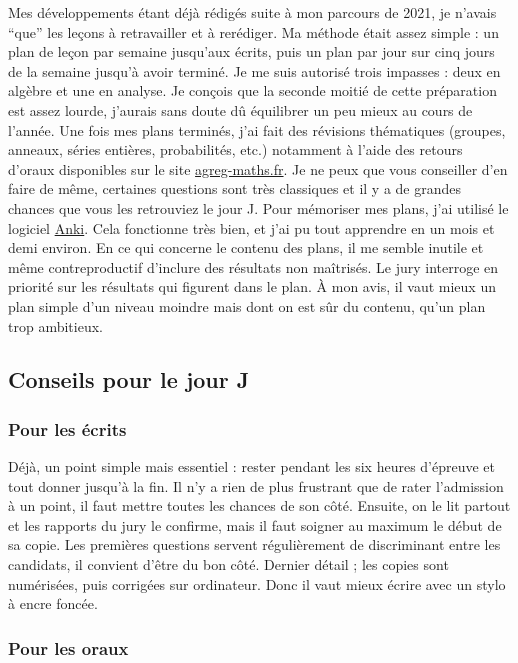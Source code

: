   Mes développements étant déjà rédigés suite à mon parcours de 2021, je n'avais ``que'' les leçons à retravailler et à rerédiger.
  \newpar
  Ma méthode était assez simple : un plan de leçon par semaine jusqu'aux écrits, puis un plan par jour sur cinq jours de la semaine jusqu'à avoir terminé. Je me suis autorisé trois impasses : deux en algèbre et une en analyse. Je conçois que la seconde moitié de cette préparation est assez lourde, j'aurais sans doute dû équilibrer un peu mieux au cours de l'année. Une fois mes plans terminés, j'ai fait des révisions thématiques (groupes, anneaux, séries entières, probabilités, etc.) notamment à l'aide des retours d'oraux disponibles sur le site \href{https://agreg-maths.fr}{agreg-maths.fr}. Je ne peux que vous conseiller d'en faire de même, certaines questions sont très classiques et il y a de grandes chances que vous les retrouviez le jour J.
  \newpar
  Pour mémoriser mes plans, j'ai utilisé le logiciel \href{https://apps.ankiweb.net/}{Anki}. Cela fonctionne très bien, et j'ai pu tout apprendre en un mois et demi environ.
  \newpar
  En ce qui concerne le contenu des plans, il me semble inutile et même contreproductif d'inclure des résultats non maîtrisés. Le jury interroge en priorité sur les résultats qui figurent dans le plan. À mon avis, il vaut mieux un plan simple d'un niveau moindre mais dont on est sûr du contenu, qu'un plan trop ambitieux.

  \subsection{Conseils pour le jour J}

  \subsubsection{Pour les écrits}

  Déjà, un point simple mais essentiel : rester pendant les six heures d'épreuve et tout donner jusqu'à la fin. Il n'y a rien de plus frustrant que de rater l'admission à un point, il faut mettre toutes les chances de son côté.
  \newpar
  Ensuite, on le lit partout et les rapports du jury le confirme, mais il faut soigner au maximum le début de sa copie. Les premières questions servent régulièrement de discriminant entre les candidats, il convient d'être du bon côté.
  \newpar
  Dernier détail ; les copies sont numérisées, puis corrigées sur ordinateur. Donc il vaut mieux écrire avec un stylo à encre foncée.

  \subsubsection{Pour les oraux}

